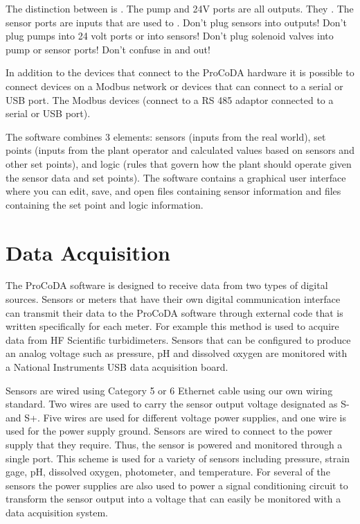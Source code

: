 \documentclass[letterpaper,10pt,english]{sphinxmanual}
\begin{document}
The distinction between  is . The pump and 24V ports are all outputs. They . The sensor ports are inputs that are used to . Don’t plug sensors into outputs! Don’t plug pumps into 24 volt ports or into sensors! Don’t plug solenoid valves into pump or sensor ports! Don’t confuse in and out!

In addition to the devices that connect to the ProCoDA hardware it is possible to connect devices on a Modbus network or devices that can connect to a serial or USB port. The Modbus devices (connect to a RS 485 adaptor connected to a serial or USB port). 

The software combines 3 elements: sensors (inputs from the real world), set points (inputs from the plant operator and calculated values based on sensors and other set points), and logic (rules that govern how the plant should operate given the sensor data and set points). The software contains a graphical user interface where you can edit, save, and open files containing sensor information and files containing the set point and logic information.


\section{Data Acquisition}
\label{\detokenize{ProCoDA/ProCoDA:data-acquisition}}
The ProCoDA software is designed to receive data from two types of digital sources. Sensors or meters that have their own digital communication interface can transmit their data to the ProCoDA software through external code that is written specifically for each meter. For example this method is used to acquire data from HF Scientific turbidimeters. Sensors that can be configured to produce an analog voltage such as pressure, pH and dissolved oxygen are monitored with a National Instruments USB data acquisition board.

Sensors are wired using Category 5 or 6 Ethernet cable using our own {\hyperref[\detokenize{ProCoDA/ProCoDA:table-procoda-sensor-wiring}]{}} wiring standard. Two wires are used to carry the sensor output voltage designated as S- and S+. Five wires are used for different voltage power supplies, and one wire is used for the power supply ground. Sensors are wired to connect to the power supply that they require. Thus, the sensor is powered and monitored through a single port. This scheme is used for a variety of sensors including pressure, strain gage, pH, dissolved oxygen, photometer, and temperature. For several of the sensors the power supplies are also used to power a signal conditioning circuit to transform the sensor output into a voltage that can easily be monitored with a data acquisition system.
\end{document}
